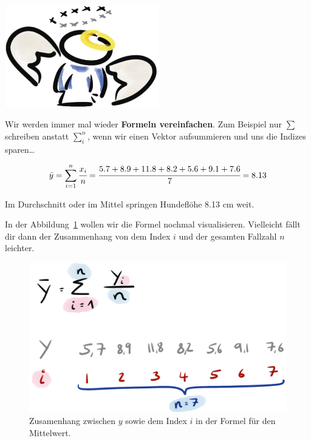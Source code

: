 \documentclass[
  letterpaper,
  DIV=11,
  oneside]{scrreport}
\begin{document}
\begin{marginfigure}

{\centering \includegraphics[width=0.5\textwidth,height=\textheight]{./images/angel_01.png}

}

\end{marginfigure}

Wir werden immer mal wieder \textbf{Formeln vereinfachen}. Zum Beispiel
nur \(\sum\) schreiben anstatt \(\sum_i^n\), wenn wir einen Vektor
aufsummieren und uns die Indizes sparen\ldots{}

\[
\bar{y} = \sum_{i=1}^{n}\cfrac{x_i}{n} =
\cfrac{5.7 + 8.9 + 11.8 + 8.2 + 5.6 + 9.1 + 7.6}{7} =
8.13
\]

Im Durchschnitt oder im Mittel springen Hundeflöhe 8.13 cm weit.

In der Abbildung~\ref{fig-index-drawn} wollen wir die Formel nochmal
visualisieren. Vielleicht fällt dir dann der Zusammenhang von dem Index
\(i\) und der gesamten Fallzahl \(n\) leichter.

\begin{figure}

{\centering \includegraphics[width=1\textwidth,height=\textheight]{./images/index-drawn.png}

}

\caption{\label{fig-index-drawn}Zusamenhang zwischen \(y\) sowie dem
Index \(i\) in der Formel für den Mittelwert.}

\end{figure}
\end{document}
